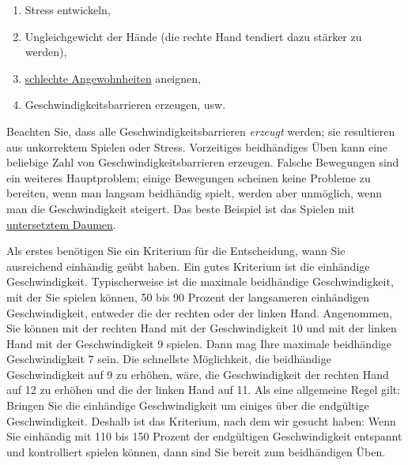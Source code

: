 \begin{enumerate}[label={\arabic*.}] 
 \item Stress entwickeln,
 \item Ungleichgewicht der Hände (die rechte Hand tendiert dazu stärker zu werden),
 \item \hyperlink{c1ii22}{schlechte Angewohnheiten} aneignen,
 \item Geschwindigkeitsbarrieren erzeugen, usw.
 \end{enumerate}

Beachten Sie, dass alle Geschwindigkeitsbarrieren \textit{erzeugt} werden; sie resultieren aus unkorrektem Spielen oder Stress.
Vorzeitiges beidhändiges Üben kann eine beliebige Zahl von Geschwindigkeitsbarrieren erzeugen.
Falsche Bewegungen sind ein weiteres Hauptproblem; einige Bewegungen scheinen keine Probleme zu bereiten, wenn man langsam beidhändig spielt, werden aber unmöglich, wenn man die Geschwindigkeit steigert.
Das beste Beispiel ist das Spielen mit \hyperlink{c1iii5a}{untersetztem Daumen}.

Als erstes benötigen Sie ein Kriterium für die Entscheidung, wann Sie ausreichend einhändig geübt haben.
Ein gutes Kriterium ist die einhändige Geschwindigkeit.
Typischerweise ist die maximale beidhändige Geschwindigkeit, mit der Sie spielen können, 50 bis 90 Prozent der langsameren einhändigen Geschwindigkeit, entweder die der rechten oder der linken Hand.
Angenommen, Sie können mit der rechten Hand mit der Geschwindigkeit 10 und mit der linken Hand mit der Geschwindigkeit 9 spielen.
Dann mag Ihre maximale beidhändige Geschwindigkeit 7 sein.
Die schnellste Möglichkeit, die beidhändige Geschwindigkeit auf 9 zu erhöhen, wäre, die Geschwindigkeit der rechten Hand auf 12 zu erhöhen und die der linken Hand auf 11.
Als eine allgemeine Regel gilt: Bringen Sie die einhändige Geschwindigkeit um einiges über die endgültige Geschwindigkeit.
Deshalb ist das Kriterium, nach dem wir gesucht haben: Wenn Sie einhändig mit 110 bis 150 Prozent der endgültigen Geschwindigkeit entspannt und kontrolliert spielen können, dann sind Sie bereit zum beidhändigen Üben.


\hypertarget{notenweise}{}

